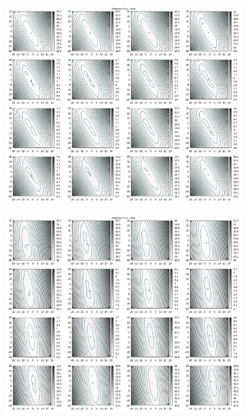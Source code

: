 \begin{appendix}
\begin{figure}[!ht]
\begin{subfigure}[t]{0.3\textwidth}
	\end{subfigure}
\end{figure}
%
\newpage
\begin{figure}[!ht]
	\centering
	\begin{subfigure}[t]{0.3\textwidth}
	     \centering
	     \includegraphics[width=\textwidth]{img/fitness/xy/a4.png}
	\end{subfigure}
	\begin{subfigure}[t]{0.3\textwidth}
		\centering
	     \includegraphics[width=\textwidth]{img/fitness/xz/a4.png}

\end{subfigure}
\end{figure}
\end{appendix}

